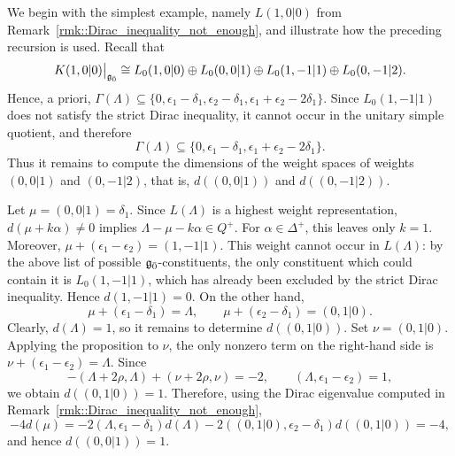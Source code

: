 \begin{example} \label{ex::easiest_example}
We begin with the simplest example, namely $L(1,0\vert0)$ from Remark~\ref{rmk::Dirac_inequality_not_enough}, and illustrate how the preceding recursion is used. Recall that
\begin{equation*}
K(1,0\vert0)\big\vert_{{\mathfrak{g}_{\bar{0}}}}
\cong
L_0(1,0\vert0)
\oplus
L_0(0,0\vert1)
\oplus
L_0(1,-1\vert1)
\oplus
L_0(0,-1\vert2).
\end{equation*}
Hence, a priori, $\Gamma(\Lambda)\subseteq\{0,\epsilon_1-\delta_1,\epsilon_2-\delta_1,\epsilon_1+\epsilon_2-2\delta_1\}$. Since $L_0(1,-1\vert1)$ does not satisfy the strict Dirac inequality, it cannot occur in the unitary simple quotient, and therefore
\begin{equation*}
\Gamma(\Lambda)
\subseteq
\{0,\epsilon_1-\delta_1,\epsilon_1+\epsilon_2-2\delta_1\}.
\end{equation*}
Thus it remains to compute the dimensions of the weight spaces of weights $(0,0\vert1)$ and $(0,-1\vert2)$, that is, $d((0,0\vert1))$ and $d((0,-1\vert2))$.

Let $\mu=(0,0\vert1)=\delta_1$. Since $L(\Lambda)$ is a highest weight representation, $d(\mu+k\alpha)\neq0$ implies $\Lambda-\mu-k\alpha\in Q^+$. For $\alpha\in\Delta^+$, this leaves only $k=1$. Moreover, $\mu+(\epsilon_1-\epsilon_2)=(1,-1\vert1)$. This weight cannot occur in $L(\Lambda)$: by the above list of possible ${\mathfrak{g}_{\bar{0}}}$-constituents, the only constituent which could contain it is $L_0(1,-1\vert1)$, which has already been excluded by the strict Dirac inequality. Hence $d(1,-1\vert1)=0$. On the other hand,
\begin{equation*}
\mu+(\epsilon_1-\delta_1)=\Lambda,
\qquad
\mu+(\epsilon_2-\delta_1)=(0,1\vert0).
\end{equation*}
Clearly, $d(\Lambda)=1$, so it remains to determine $d((0,1\vert0))$. Set $\nu=(0,1\vert0)$. Applying the proposition to $\nu$, the only nonzero term on the right-hand side is $\nu+(\epsilon_1-\epsilon_2)=\Lambda$. Since
\begin{equation*}
-(\Lambda+2\rho,\Lambda)+(\nu+2\rho,\nu)=-2,
\qquad
(\Lambda,\epsilon_1-\epsilon_2)=1,
\end{equation*}
we obtain $d((0,1\vert0))=1$. Therefore, using the Dirac eigenvalue computed in Remark~\ref{rmk::Dirac_inequality_not_enough},
\begin{equation*}
-4d(\mu)
=
-2(\Lambda,\epsilon_1-\delta_1)d(\Lambda)
-2((0,1\vert0),\epsilon_2-\delta_1)d((0,1\vert0))
=
-4,
\end{equation*}
and hence $d((0,0\vert1))=1$.


\end{example}
